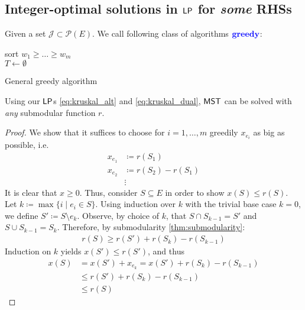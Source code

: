 
\subsection{Integer-optimal solutions in $\mathsf{LP}$ for \emph{some} RHSs}
\begin{definition}[Greedy]
    Given a set $\mathcal{J} \subset \mathcal{P}(E)$. We call following class of algorithms
    $\vocab{greedy}$:
    \\
    \begin{algorithm}[H]
        \SetAlgoLined
        sort $w_1 \geq \dots \geq w_m$\\
        $T \leftarrow \emptyset$\\
        \caption{General greedy algorithm}
    \end{algorithm} \noindent
\end{definition}
\begin{theorem}
    Using our $\mathsf{LP}$s \eqref{eq:kruskal_alt} and \eqref{eq:kruskal_dual}, $\mathsf{MST}$
    can be solved with \emph{any} submodular function $r$.
\end{theorem}
\begin{proof}
    We show that it suffices to choose for $i=1,\dots,m$ greedily $x_{e_i}$ as big as possible, i.e.
    \begin{align*}
        x_{e_1} & \coloneqq r(S_1)        \\
        x_{e_2} & \coloneqq r(S_2)-r(S_1) \\
                & \vdots
    \end{align*}
    It is clear that $x \geq 0$. Thus, consider $S \subseteq E$ in order to show $x(S) \leq r(S)$.
    Let $k \coloneqq \max \{i \mid e_i \in S\}$. Using induction over $k$ with the trivial base case $k=0$,
    we define $S' \coloneqq S \setminus e_k$. Observe, by choice of $k$, that
    $S \cap S_{k-1} = S'$ and $S \cup S_{k-1} = S_k$.
    Therefore, by submodularity \ref{thm:submodularity}:
    \begin{align*}
        r(S) \geq r(S') + r(S_k) - r(S_{k-1})
    \end{align*}
    Induction on $k$ yields $x(S') \leq r(S')$, and thus
    \begin{align*}
        x(S) & = x(S') + x_{e_k}=x(S')+r(S_k)-r(S_{k-1}) \\
             & \leq r(S')+ r(S_k) - r(S_{k-1})           \\
             & \leq r(S)
    \end{align*}
\end{proof}
